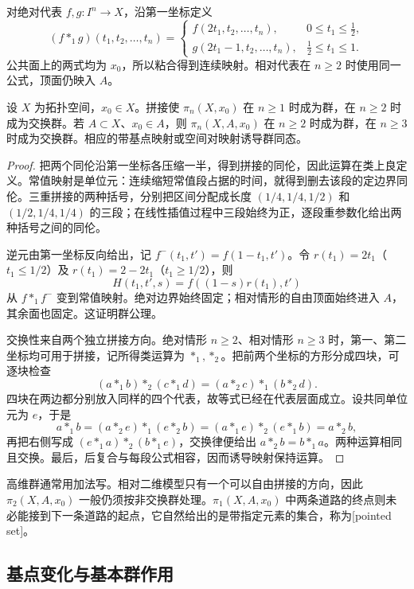 对绝对代表 \(f,g:I^n\to X\)，沿第一坐标定义
\[
	(f*_1g)(t_1,t_2,\ldots,t_n)=
	\begin{cases}
		f(2t_1,t_2,\ldots,t_n),&0\le t_1\le\tfrac12,\\
		g(2t_1-1,t_2,\ldots,t_n),&\tfrac12\le t_1\le1.
	\end{cases}
\]
公共面上的两式均为 \(x_0\)，所以粘合得到连续映射。相对代表在 \(n\ge2\) 时使用同一公式，顶面仍映入 \(A\)。

\begin{proposition}\label{g2:prop:homotopy-group-operations}
	设 \(X\) 为拓扑空间，\(x_0\in X\)。拼接使 \(\pi_n(X,x_0)\) 在 \(n\ge1\) 时成为群，在 \(n\ge2\) 时成为交换群。若 \(A\subset X\)、\(x_0\in A\)，则 \(\pi_n(X,A,x_0)\) 在 \(n\ge2\) 时成为群，在 \(n\ge3\) 时成为交换群。相应的带基点映射或空间对映射诱导群同态。
\end{proposition}
\begin{proof}
	把两个同伦沿第一坐标各压缩一半，得到拼接的同伦，因此运算在类上良定义。常值映射是单位元：连续缩短常值段占据的时间，就得到删去该段的定边界同伦。三重拼接的两种括号，分别把区间分配成长度 \((1/4,1/4,1/2)\) 和 \((1/2,1/4,1/4)\) 的三段；在线性插值过程中三段始终为正，逐段重参数化给出两种括号之间的同伦。

	逆元由第一坐标反向给出，记 \(f^{-}(t_1,t')=f(1-t_1,t')\)。令 \(r(t_1)=2t_1\)（\(t_1\le1/2\)）及 \(r(t_1)=2-2t_1\)（\(t_1\ge1/2\)），则
	\[
		H(t_1,t',s)=f((1-s)r(t_1),t')
	\]
	从 \(f*_1f^-\) 变到常值映射。绝对边界始终固定；相对情形的自由顶面始终进入 \(A\)，其余面也固定。这证明群公理。

	交换性来自两个独立拼接方向。绝对情形 \(n\ge2\)、相对情形 \(n\ge3\) 时，第一、第二坐标均可用于拼接，记所得类运算为 \(*_1,*_2\)。把前两个坐标的方形分成四块，可逐块检查
	\[
		(a*_1b)*_2(c*_1d)=(a*_2c)*_1(b*_2d).
	\]
	四块在两边都分别放入同样的四个代表，故等式已经在代表层面成立。设共同单位元为 \(e\)，于是
	\[
		a*_1b=(a*_2e)*_1(e*_2b)=(a*_1e)*_2(e*_1b)=a*_2b,
	\]
	再把右侧写成 \((e*_1a)*_2(b*_1e)\)，交换律便给出 \(a*_2b=b*_1a\)。两种运算相同且交换。最后，后复合与每段公式相容，因而诱导映射保持运算。
\end{proof}

高维群通常用加法写。相对二维模型只有一个可以自由拼接的方向，因此 \(\pi_2(X,A,x_0)\) 一般仍须按非交换群处理。\(\pi_1(X,A,x_0)\) 中两条道路的终点则未必能接到下一条道路的起点，它自然给出的是带指定元素的集合，称为[pointed set]。

\subsection{基点变化与基本群作用}
\label{g2:subsec:0801:03}

